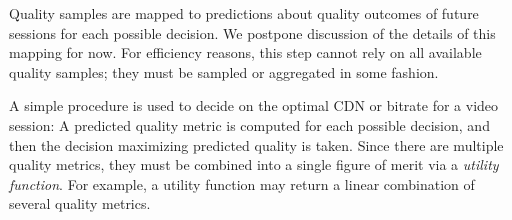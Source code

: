  Quality samples are mapped to predictions about quality outcomes of future sessions for each possible decision.  We postpone discussion of the details of this mapping for now.  For efficiency reasons, this step cannot rely on all available quality samples; they must be sampled or aggregated in some fashion.

 A simple procedure is used to decide on the optimal CDN or bitrate for a video session: A predicted quality metric is computed for each possible decision, and then the decision maximizing predicted quality is taken.  Since there are multiple quality metrics, they must be combined into a single figure of merit via a \emph{utility function}.  For example, a utility function may return a linear combination of several quality metrics.
